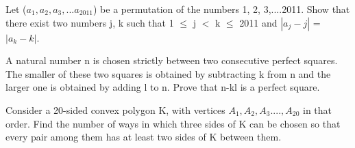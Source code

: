 \item Let ($a_1, a_2, a_3,...a_{2011}$) be a permutation of the numbers 1, 2, 3,....2011. Show that there exist two numbers j, k such that 1 $\leq$ j $<$ k $\leq$ 2011 and $|a_j-j|$ = $|a_k-k|$.

\item A natural number n is chosen strictly between two consecutive perfect squares. The smaller of these two squares is obtained by subtracting k from n and the larger one is obtained by adding l to n. Prove that n-kl is a perfect square.

\item Consider a 20-sided convex polygon K, with vertices $A_1, A_2, A_3....,A_{20}$ in that order. Find the number of ways in which three sides of K can be chosen so that every pair among them has at least two sides of K between them.

